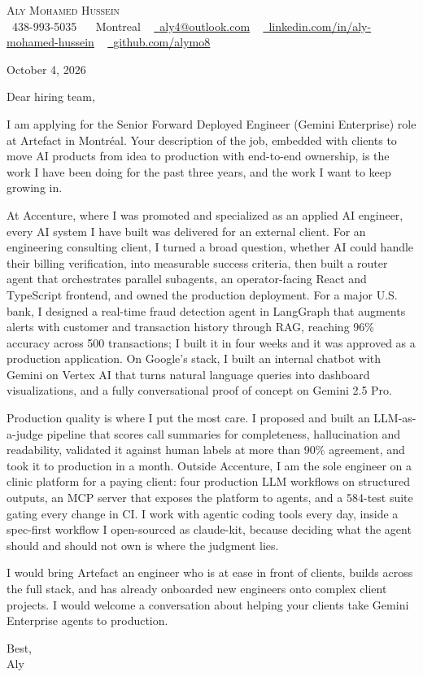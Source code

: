 \documentclass[letterpaper,11pt]{article}
\begin{document}
\begin{center}
    {\Huge \scshape Aly Mohamed Hussein} \\ \vspace{1pt}
    \small \raisebox{-0.1\height}\faPhone\ 438-993-5035 ~
    {\raisebox{-0.2\height}\faHome\ {Montreal}}  ~
    \href{mailto:aly4@outlook.com}{\raisebox{-0.2\height}\faEnvelope\  \underline{aly4@outlook.com}} ~
    \href{https://linkedin.com/in/aly-mohamed-hussein}{\raisebox{-0.2\height}\faLinkedin\ \underline{linkedin.com/in/aly-mohamed-hussein}}  ~
    \href{https://github.com/alymo8}{\raisebox{-0.2\height}\faGithub\ \underline{github.com/alymo8}}
\end{center}
\vspace{10pt}
October 4, 2026

Dear hiring team,

I am applying for the Senior Forward Deployed Engineer (Gemini Enterprise) role at Artefact in Montréal. Your description of the job, embedded with clients to move AI products from idea to production with end-to-end ownership, is the work I have been doing for the past three years, and the work I want to keep growing in.

At Accenture, where I was promoted and specialized as an applied AI engineer, every AI system I have built was delivered for an external client. For an engineering consulting client, I turned a broad question, whether AI could handle their billing verification, into measurable success criteria, then built a router agent that orchestrates parallel subagents, an operator-facing React and TypeScript frontend, and owned the production deployment. For a major U.S. bank, I designed a real-time fraud detection agent in LangGraph that augments alerts with customer and transaction history through RAG, reaching 96\% accuracy across 500 transactions; I built it in four weeks and it was approved as a production application. On Google's stack, I built an internal chatbot with Gemini on Vertex AI that turns natural language queries into dashboard visualizations, and a fully conversational proof of concept on Gemini 2.5 Pro.

Production quality is where I put the most care. I proposed and built an LLM-as-a-judge pipeline that scores call summaries for completeness, hallucination and readability, validated it against human labels at more than 90\% agreement, and took it to production in a month. Outside Accenture, I am the sole engineer on a clinic platform for a paying client: four production LLM workflows on structured outputs, an MCP server that exposes the platform to agents, and a 584-test suite gating every change in CI. I work with agentic coding tools every day, inside a spec-first workflow I open-sourced as claude-kit, because deciding what the agent should and should not own is where the judgment lies.

I would bring Artefact an engineer who is at ease in front of clients, builds across the full stack, and has already onboarded new engineers onto complex client projects. I would welcome a conversation about helping your clients take Gemini Enterprise agents to production.

Best, \\ Aly
\end{document}
